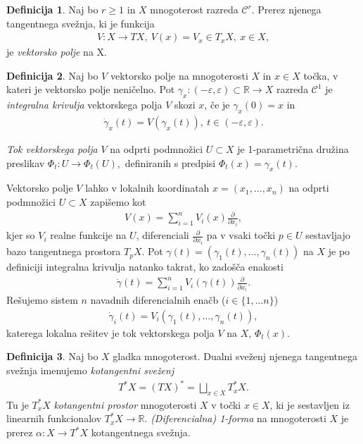 \documentclass[12pt,a4paper,twoside]{article}
\theoremstyle{definition} %
\newtheorem{definicija}{Definicija}[section]
\theoremstyle{plain} %
\numberwithin{equation}{section}  %
\newcommand{\R}{\mathbb R}
\begin{document}
\begin{definicija}
Naj bo $r \geq 1$ in $X$ mnogoterost razreda $\mathcal{C}^{r}$. Prerez njenega tangentnega svežnja, ki je funkcija 
\begin{align*}
V \colon X \to TX, \ V(x) = V_{x} \in T_{x}X, \ x \in X,
\end{align*}
je \emph{vektorsko polje} na X.
\end{definicija}

\begin{definicija}
Naj bo $V$ vektorsko polje na mnogoterosti $X$ in $x \in X$ točka, v kateri je vektorsko polje neničelno. Pot $\gamma_{x} \colon (-\varepsilon, \varepsilon) \subset \R \to X$ razreda $\mathcal{C}^{1}$ je \emph{integralna krivulja} vektorskega polja $V$ skozi $x$, če je $\gamma_{x}(0) = x$ in
\begin{align*}
\dot{\gamma}_{x} (t) = V(\gamma _{x}(t)), \ t \in (-\varepsilon, \varepsilon).
\end{align*}

\emph{Tok vektorskega polja} $V$ na odprti podmnožici $U \subset X$ je 1-parametrična družina preslikav
$ \Phi_{t} \colon U \to \Phi_{t}(U),$ definiranih s predpisi $\Phi_{t}(x) = \gamma_{x}(t)$.
\end{definicija}

Vektorsko polje $V$ lahko v lokalnih koordinatah $x = (x_{1}, \dots, x_{n})$ na odprti podmnožici $U \subset X$ zapišemo kot 
\begin{align}
V(x) = \sum_{i=1}^{n} V_{i}(x) \frac{\partial}{\partial x_{i}},
\end{align}
kjer so $V_{i}$ realne funkcije na $U$, diferenciali $\frac{\partial}{\partial x_{i}}$ pa v vsaki točki $p \in U$ sestavljajo bazo tangentnega prostora $T_{p}X$.
Pot $\gamma (t) = (\gamma_{1}(t), \dots, \gamma_{n}(t))$ na $X$ je po definiciji integralna krivulja natanko takrat, ko zadošča enakosti 
\begin{align*}
\dot{\gamma}(t) = \sum_{i=1}^{n} V_{i}(\gamma(t)) \frac{\partial}{\partial x_{i}}.
\end{align*}
Rešujemo sistem $n$ navadnih diferencialnih enačb ($i \in \{ 1, \dots n \}$)
\begin{align*}
\dot{\gamma}_{i}(t) = V_{i}(\gamma_{1}(t), \dots, \gamma_{n}(t)),
\end{align*}
katerega lokalna rešitev je tok vektorskega polja $V$ na $X$, $\Phi_{t}(x)$. 

\begin{definicija}
Naj bo $X$ gladka mnogoterost. Dualni sveženj njenega tangentnega svežnja imenujemo \emph{kotangentni sveženj}
\begin{align}
T^{*}X = (TX)^{*} = \bigsqcup_{x \in X} T_{x}^{*}X.
\end{align}
Tu je $T_{x}^{*}X$ \emph{kotangentni prostor} mnogoterosti $X$ v točki $x \in X$, ki je sestavljen iz linearnih funkcionalov $T_{x}^{*}X \to \R$.
\emph{(Diferencialna) 1-forma} na mnogoterosti $X$ je prerez $\alpha \colon X \to T^{*}X$ kotangentnega svežnja.
\end{definicija}
\end{document}
